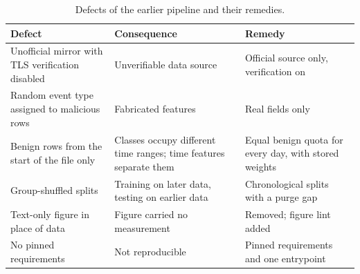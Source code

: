 \begin{table}[t]
\centering\small
\caption{Defects of the earlier pipeline and their remedies.}
\begin{tabular}{lp{3.2cm}p{3.2cm}}
\toprule
Defect & Consequence & Remedy \\
\midrule
Unofficial mirror with TLS verification disabled & Unverifiable data source & Official source only, verification on \\
Random event type assigned to malicious rows & Fabricated features & Real fields only \\
Benign rows from the start of the file only & Classes occupy different time ranges; time features separate them & Equal benign quota for every day, with stored weights \\
Group-shuffled splits & Training on later data, testing on earlier data & Chronological splits with a purge gap \\
Text-only figure in place of data & Figure carried no measurement & Removed; figure lint added \\
No pinned requirements & Not reproducible & Pinned requirements and one entrypoint \\
\bottomrule
\end{tabular}
\label{tab:legacy_pipeline_defects}
\end{table}
